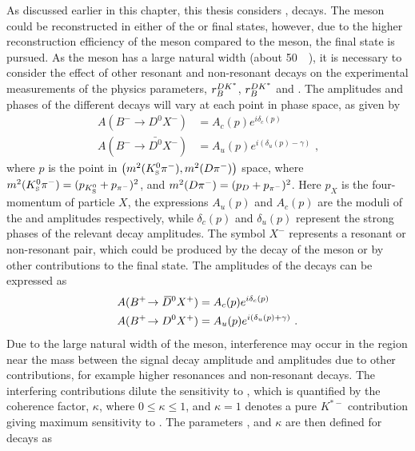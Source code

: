 As discussed earlier in this chapter, this thesis considers \decay{\Bm}{\D\Kstarm}, \decay{\Kstarm}{\KS\pim} decays. The \Kstarm meson could be reconstructed in either of the \KS\pim or \Km\piz final states, however, due to the higher reconstruction efficiency of the \KS meson compared to the \piz meson, the \KS\pim final state is pursued. As the \Kstarm meson has a large natural width (about 50~\mevcc~\cite{PDG2016}), it is necessary to consider the effect of other resonant and non-resonant \decay{\Bm}{\D\KS\pim} decays on the experimental measurements of the physics parameters, $r_B^{DK^*}$, $r_B^{DK^*}$ and \Pgamma. The amplitudes and phases of the different decays will vary at each point in \decay{\Bm}{\D\KS\pim} phase space, as given by
\begin{align*}
A(B^- \to D^0 X^-) &= A_c(p) e^{i\delta_c(p)} \\
A(B^- \to \bar{D^0} X^-) &= A_u(p) e^{i(\delta_u(p) - \gamma)} \text{ ,}
\end{align*}
where $p$ is the point in $\left(m^2({{K}^0_{\mathrm{ \scriptscriptstyle S}}}{{\pi}^-}),m^2({D}{{\pi}^-})\right)$ space, where $m^2({{K}^0_{\mathrm{ \scriptscriptstyle S}}}{{\pi}^-}) = (p_{{{K}^0_{\mathrm{ \scriptscriptstyle S}}}} + p_{{{\pi}^-}})^2$, and $m^2({D}{{\pi}^-}) = (p_{{D}} + p_{{{\pi}^-}})^2$. Here $p_{X}$ is the four-momentum of particle $X$, the expressions $A_u(p)$ and $A_c(p)$ are the moduli of the \decay{\bquark}{\uquark} and \decay{\bquark}{\cquark} amplitudes respectively, while $\delta_{c}(p)$ and $\delta_{u}(p)$ represent the strong phases of the relevant decay amplitudes. The symbol $X^-$ represents a resonant or non-resonant \KS\pim pair, which could be produced by the decay of the \Kstarm meson or by other contributions to the \decay{\Bm}{\D\KS\pim} final state. The amplitudes of the \Bp decays can be expressed as 
\begin{align*}
A({{{B}^+}}\!\rightarrow {\ensuremath{{\kern 0.2em\overline{\kern -0.2em D}{}}{}^0}} X^+) &= A_c(p) e^{i\delta_c(p)} \\
A({{{B}^+}}\!\rightarrow {\ensuremath{{D}^0}} X^+) &= A_u(p) e^{i(\delta_u(p) + \gamma)} \text{ .}
\end{align*}
Due to the large natural width of the \Kstarm meson, interference may occur in the region near the \Kstarm mass between the signal \Kstarm decay amplitude and amplitudes due to other \decay{\Bm}{\D\KS\pim} contributions, for example higher \KS\pim resonances and non-resonant decays. The interfering contributions dilute the sensitivity to \Pgamma, which is quantified by the \btodkst coherence factor, $\kappa$, where $0 \leq \kappa \leq 1$, and $\kappa = 1$ denotes a pure $K^{*-}$ contribution giving maximum sensitivity to \Pgamma. The parameters \rb, \deltab and $\kappa$ are then defined for \btodkst decays as
